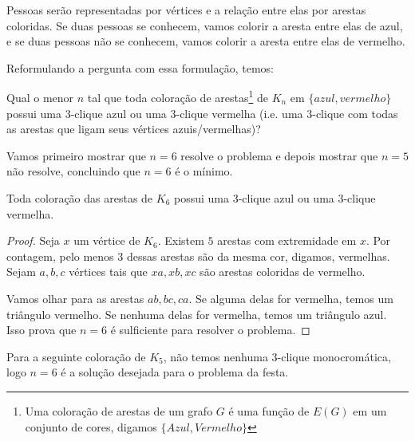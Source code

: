 Pessoas serão representadas por vértices e a relação entre elas por arestas coloridas. Se duas pessoas se conhecem, vamos colorir a aresta entre elas de azul, e se duas pessoas não se conhecem, vamos colorir a aresta entre elas de vermelho.

Reformulando a pergunta com essa formulação, temos:

\begin{problem}
    Qual o menor $n$ tal que toda coloração de arestas\footnote{Uma coloração de arestas de um grafo $G$ é uma função de $E(G)$ em um conjunto de cores, digamos $\{Azul, Vermelho\}$} de $K_n$ em $\{azul, vermelho\}$ possui uma 3-clique azul ou uma 3-clique vermelha (i.e. uma 3-clique com todas as arestas que ligam seus vértices azuis/vermelhas)?
\end{problem}

Vamos primeiro mostrar que $n=6$ resolve o problema e depois mostrar que $n=5$ não resolve, concluindo que $n=6$ é o mínimo.

\begin{prop}
    Toda coloração das arestas de $K_6$ possui uma 3-clique azul ou uma 3-clique vermelha.
\end{prop}
\begin{proof}
    Seja $x$ um vértice de $K_6$. Existem $5$ arestas com extremidade em $x$. Por contagem, pelo menos $3$ dessas arestas são da mesma cor, digamos, vermelhas. Sejam $a,b,c$ vértices tais que $xa,xb,xc$ são arestas coloridas de vermelho.

    Vamos olhar para as arestas $ab,bc,ca$. Se alguma delas for vermelha, temos um triângulo vermelho. Se nenhuma delas for vermelha, temos um triângulo azul. Isso prova que $n=6$ é sulficiente para resolver o problema.
\end{proof}

Para a seguinte coloração de $K_5$, não temos nenhuma 3-clique monocromática, logo $n=6$ é a solução desejada para o problema da festa.
\begin{center}
\end{center}

